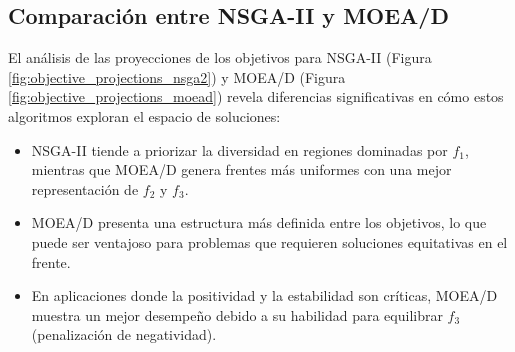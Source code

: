 \subsection{Comparación entre NSGA-II y MOEA/D}

El análisis de las proyecciones de los objetivos para NSGA-II (Figura \ref{fig:objective_projections_nsga2}) y MOEA/D (Figura \ref{fig:objective_projections_moead}) revela diferencias significativas en cómo estos algoritmos exploran el espacio de soluciones:
\begin{itemize}
    \item NSGA-II tiende a priorizar la diversidad en regiones dominadas por \(f_1\), mientras que MOEA/D genera frentes más uniformes con una mejor representación de \(f_2\) y \(f_3\).
    \item MOEA/D presenta una estructura más definida entre los objetivos, lo que puede ser ventajoso para problemas que requieren soluciones equitativas en el frente.
    \item En aplicaciones donde la positividad y la estabilidad son críticas, MOEA/D muestra un mejor desempeño debido a su habilidad para equilibrar \(f_3\) (penalización de negatividad).
\end{itemize}

